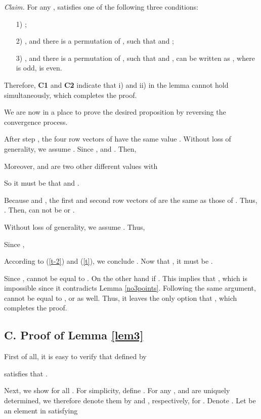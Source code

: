\documentclass[a4paper, 11pt]{article}
\begin{document}
\medskip

{\it Claim.} For any ,  satisfies one of the following three conditions:
\begin{itemize}
\item[1)] ;

\item [2)] , and there is a permutation  of , such that  and ;

\item [3)] , and there is a permutation  of , such that  and ,  can be written as , where  is odd,  is even.
\end{itemize}

\medskip


Therefore, {\bf C1} and {\bf C2} indicate that i) and ii) in the lemma cannot hold simultaneously, which completes the proof. \hfill



We are now in a place to prove the desired  proposition by reversing the convergence process.

After step , the four row vectors of   have the same value . Without loss of generality, we assume . Since ,  and . Then,

Moreover,  and  are two other different values with

So it must be that  and .

Because  and , the first and second row vectors of  are the same as those of .
Thus, . Then,  can not be  or .

Without loss of generality, we assume .
Thus,


Since ,


According to (\ref{t-2}) and (\ref{t}), we conclude . Now that , it must be .

Since ,  cannot be equal to . On the other hand    if . This implies that , which is impossible since it contradicts Lemma \ref{no3points}. Following the same argument,  cannot be equal to ,  or  as well.
Thus, it leaves the only option that , which completes the proof.


\subsection*{C. Proof of Lemma \ref{lem3}} First of all, it is easy to verify that  defined by

satisfies that .

Next, we show  for all . For simplicity,  define . For any ,   and  are uniquely determined, we therefore denote them by  and , respectively, for . Denote . Let  be an element in  satisfying
\end{document}
